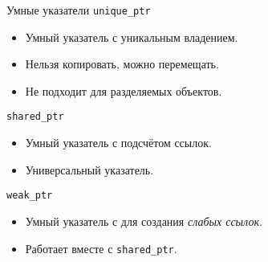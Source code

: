 \documentclass{beamer}
\begin{document}
\begin{frame}[fragile]{Умные указатели}
\texttt{unique\_ptr}
\begin{itemize}
    \item Умный указатель с уникальным владением.
    \item Нельзя копировать, можно перемещать.
    \item Не подходит для разделяемых объектов.
\end{itemize}
\texttt{shared\_ptr}
\begin{itemize}
    \item Умный указатель с подсчётом ссылок.
    \item Универсальный указатель.
\end{itemize}
\texttt{weak\_ptr}
\begin{itemize}
    \item Умный указатель с для создания \emph{слабых ссылок}.
    \item Работает вместе с \texttt{shared\_ptr}.
\end{itemize}
\end{frame}
\end{document}

